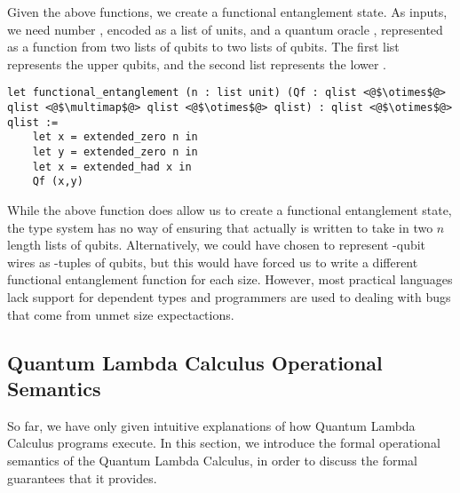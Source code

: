 Given the above functions, we create a functional entanglement state.
As inputs, we need number , encoded as a list of units, and a quantum oracle , represented as a function from two lists of qubits to two lists of qubits.
The first list represents the upper  qubits, and the second list represents the lower .
\begin{lstlisting}[style=customcoq]
let functional_entanglement (n : list unit) (Qf : qlist <@$\otimes$@> qlist <@$\multimap$@> qlist <@$\otimes$@> qlist) : qlist <@$\otimes$@> qlist :=
    let x = extended_zero n in
    let y = extended_zero n in 
    let x = extended_had x in
    Qf (x,y)
\end{lstlisting}
While the above function does allow us to create a functional entanglement state, the type system has no way of ensuring that  actually is written to take in two $n$ length lists of qubits.
Alternatively, we could have chosen to represent -qubit wires as -tuples of qubits, but this would have forced us to write a different functional entanglement function for each size.
However, most practical languages lack support for dependent types and programmers are used to dealing with bugs that come from unmet size expectactions.


\subsection{Quantum Lambda Calculus Operational Semantics}
So far, we have only given intuitive explanations of how Quantum Lambda Calculus programs execute.
In this section, we introduce the formal operational semantics of the Quantum Lambda Calculus, in order to discuss the formal guarantees that it provides.

